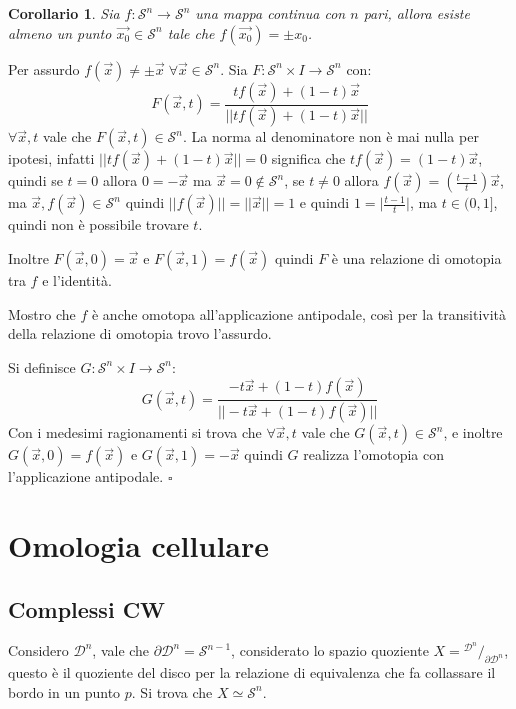 \documentclass[10pt, twoside=false, x11names]{scrbook}
\newtheorem{corollary}[theorem]{Corollario}
\newenvironment{proof}{{\textbf{Dimostrazione}:}}{\hfill $\square$}
\newcommand{\Sph}[1][]{\mathcal{S}^#1}
\newcommand{\Disk}[1][]{\mathcal{D}^#1}
\newcommand*\quot[2]{{^{\textstyle #1}\big/_{\textstyle #2}}}
\begin{document}
\begin{corollary}
  Sia $ f \colon \Sph{n} \to \Sph{n} $ una mappa continua con $ n $ pari, allora esiste almeno
  un punto $ \vec{x_0} \in \Sph{n} $ tale che $ f(\vec{x_0}) = \pm x_0 $.
\end{corollary}
\begin{proof}
  Per assurdo $ f(\vec{x}) \not = \pm \vec{x} \; \forall \vec{x} \in \Sph{n} $. Sia $ F \colon \Sph{n} \times I \to \Sph{n} $
  con:
  \[
    F(\vec{x}, t) = \frac{t f(\vec{x}) + (1-t)\vec{x}}{|| t f(\vec{x}) + (1-t)\vec{x} ||}
  \]
  $ \forall \vec{x}, t $ vale che $ F(\vec{x}, t) \in \Sph{n} $.
  La norma al denominatore non è mai nulla per ipotesi, infatti $ || t f(\vec{x}) + (1-t) \vec{x} || = 0 $
  significa che $ t f(\vec{x}) = (1-t)\vec{x} $, quindi se $ t = 0 $ allora $ 0 = - \vec{x} $ ma $ \vec{x} = 0 \not \in \Sph{n} $,
  se $ t \not = 0 $ allora $ f(\vec{x}) = \left(\frac{t-1}{t}\right)\vec{x} $, ma $ \vec{x}, f(\vec{x}) \in \Sph{n} $
  quindi $ || f(\vec{x}) || = || \vec{x} || = 1 $ e quindi $ 1 = \big \rvert \frac{t-1}{t}\big \lvert $,
  ma $ t \in (0,1] $, quindi non è possibile trovare $ t $.

  Inoltre $ F(\vec{x}, 0) = \vec{x} $ e $ F(\vec{x}, 1) = f(\vec{x}) $ quindi $ F $ è una relazione di omotopia
  tra $ f $ e l'identità.

  Mostro che $ f $ è anche omotopa all'applicazione antipodale, così per la transitività della
  relazione di omotopia trovo l'assurdo.

  Si definisce  $ G\colon \Sph{n} \times I \to \Sph{n} $:
  \[
    G(\vec{x}, t) = \frac{-t \vec{x} + (1-t)f(\vec{x})}{|| -t \vec{x} + (1-t)f(\vec{x}) ||}
  \]
  Con i medesimi ragionamenti si trova che   $ \forall \vec{x}, t $ vale che $ G(\vec{x}, t) \in \Sph{n} $, e inoltre
  $ G(\vec{x}, 0) = f(\vec{x}) $ e $ G(\vec{x}, 1) = - \vec{x} $ quindi $ G $ realizza
  l'omotopia con l'applicazione antipodale.
\end{proof}


\chapter{Omologia cellulare}

\section{Complessi CW}

Considero $ \Disk{n} $, vale che $ \partial\Disk{n} = \Sph{n-1} $, considerato lo spazio quoziente
$ X = \quot{\Disk{n}}{\partial \Disk{n}} $, questo è il quoziente del disco per la relazione
di equivalenza che fa collassare il bordo in un punto $ p $. Si trova che $ X \simeq \Sph{n} $.
\end{document}
